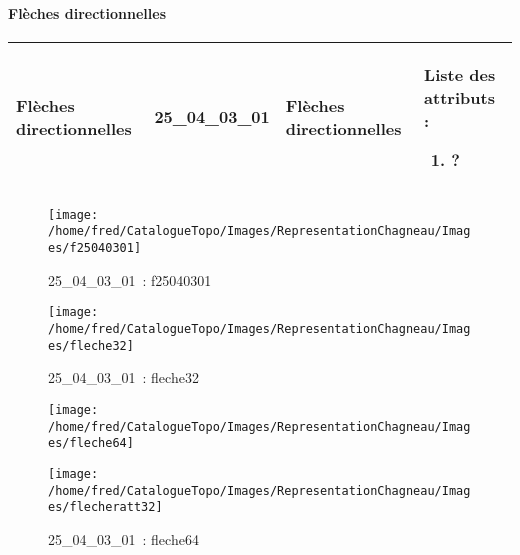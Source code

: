 \documentclass[12pt,titlepage]{book}
\begin{document}
\paragraph{Flèches directionnelles}
\noindent
\vspace{\baselineskip}

\renewcommand{\arraystretch}{1.2}
\begin{supertabular}{|p{10cm}|c|p{13cm}|p{12cm}|}
 Flèches directionnelles & 25\_04\_03\_01 & Flèches directionnelles & Liste des attributs :
\begin{enumerate}
  \item ?\end{enumerate}
\\
\hline
\end{supertabular}
\begin{figure}[h!]
  \hfill         %
  \begin{minipage}[t]{3cm}
    \begin{center}
      \texttt{[image: /home/fred/CatalogueTopo/Images/RepresentationChagneau/Images/f25040301]}
      \caption[~25\_04\_03\_01]{\small{25\_04\_03\_01~:} \tiny{f25040301}}\label{f25040301}
    \end{center}
  \end{minipage}
  \begin{minipage}[t]{3cm}
    \begin{center}
      \texttt{[image: /home/fred/CatalogueTopo/Images/RepresentationChagneau/Images/fleche32]}
      \caption[~25\_04\_03\_01]{\small{25\_04\_03\_01~:} \tiny{fleche32}}\label{fleche32}
    \end{center}
  \end{minipage}
  \begin{minipage}[t]{3cm}
    \begin{center}
      \texttt{[image: /home/fred/CatalogueTopo/Images/RepresentationChagneau/Images/fleche64]}
      \caption[~25\_04\_03\_01]{\small{25\_04\_03\_01~:} \tiny{fleche64}}\label{fleche64}
    \end{center}
  \end{minipage}
  \begin{minipage}[t]{3cm}
    \begin{center}
      \texttt{[image: /home/fred/CatalogueTopo/Images/RepresentationChagneau/Images/flecheratt32]}

\end{center}
\end{minipage}
\end{figure}
\end{document}
